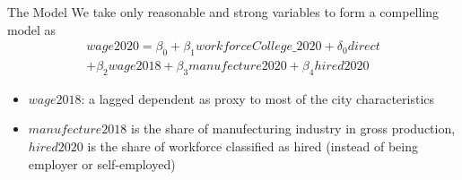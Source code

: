 \documentclass[compress]{beamer}
\begin{document}
\begin{frame}{The Model}
  We take only reasonable and strong variables to form a compelling model as
  \begin{multline}
    wage2020 = \beta_0 + \beta_1 workforceCollege\_2020 + \delta_0 direct\\ + \beta_2 wage2018 + \beta_3 manufecture2020 + \beta_4 hired2020
  \end{multline}
  \begin{itemize}
    \item $wage2018$: a lagged dependent as proxy to most of the city characteristics
    \item $manufecture2018$ is the share of manufecturing industry in gross production, $hired2020$ is the share of workforce classified as hired (instead of being employer or self-employed)
  \end{itemize}
\end{frame}
\end{document}
